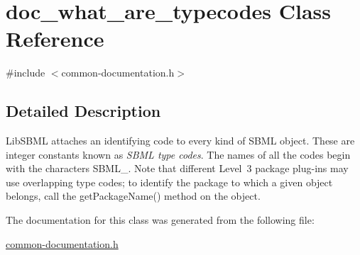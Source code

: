 \hypertarget{classdoc__what__are__typecodes}{}\section{doc\+\_\+what\+\_\+are\+\_\+typecodes Class Reference}
\label{classdoc__what__are__typecodes}


{\ttfamily \#include $<$common-\/documentation.\+h$>$}



\subsection{Detailed Description}
\begin{DoxyParagraph}{}
Lib\+S\+B\+ML attaches an identifying code to every kind of S\+B\+ML object. These are integer constants known as {\itshape S\+B\+ML type codes}. The names of all the codes begin with the characters {\ttfamily S\+B\+M\+L\+\_\+}. Note that different Level~3 package plug-\/ins may use overlapping type codes; to identify the package to which a given object belongs, call the {\ttfamily get\+Package\+Name()} method on the object. 
\end{DoxyParagraph}


The documentation for this class was generated from the following file\+:\begin{DoxyCompactItemize}
\item 
\hyperlink{common-documentation_8h}{common-\/documentation.\+h}\end{DoxyCompactItemize}
